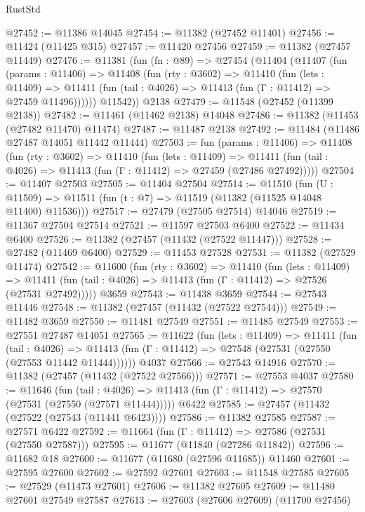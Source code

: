 \begin{lexlean}{RustStd}
\begin{coremodule}
@27452 := @11386 @14045
@27454 := @11382 (@27452 @11401)
@27456 := @11424 (@11425 @315)
@27457 := @11420 @27456
@27459 := @11382 (@27457 @11449)
@27476 := @11381
    (fun (fn : @89) =>
    @27454
      (@11404
        (@11407
          (fun (params : @11406) =>
          @11408
            (fun (rty : @3602) =>
            @11410
              (fun (lets : @11409) =>
              @11411 (fun (tail : @4026) => @11413 (fun (Γ : @11412) => @27459 @11496))))))
        @11542))
    @2138
@27479 := @11548 (@27452 (@11399 @2138))
@27482 := @11461 (@11462 @2138) @14048
@27486 := @11382 (@11453 (@27482 @11470) @11474)
@27487 := @11487 @2138
@27492 := @11484 (@11486 @27487 @14051 @11442 @11444)
@27503 := fun (params : @11406) =>
  @11408
    (fun (rty : @3602) =>
    @11410
      (fun (lets : @11409) =>
      @11411 (fun (tail : @4026) => @11413 (fun (Γ : @11412) => @27459 (@27486 @27492)))))
@27504 := @11407 @27503
@27505 := @11404 @27504
@27514 := @11510
    (fun (U : @11509) => @11511 (fun (t : @7) => @11519 (@11382 (@11525 @14048 @11400) @11536)))
@27517 := @27479 (@27505 @27514) @14046
@27519 := @11367 @27504 @27514
@27521 := @11597 @27503 @6400
@27522 := @11434 @6400
@27526 := @11382 (@27457 (@11432 (@27522 @11447)))
@27528 := @27482 (@11469 @6400)
@27529 := @11453 @27528
@27531 := @11382 (@27529 @11474)
@27542 := @11600
    (fun (rty : @3602) =>
    @11410
      (fun (lets : @11409) =>
      @11411 (fun (tail : @4026) => @11413 (fun (Γ : @11412) => @27526 (@27531 @27492)))))
    @3659
@27543 := @11438 @3659
@27544 := @27543 @11446
@27548 := @11382 (@27457 (@11432 (@27522 @27544)))
@27549 := @11482 @3659
@27550 := @11481 @27549
@27551 := @11485 @27549
@27553 := @27551 @27487 @14051
@27565 := @11622
    (fun (lets : @11409) =>
    @11411
      (fun (tail : @4026) =>
      @11413 (fun (Γ : @11412) => @27548 (@27531 (@27550 (@27553 @11442 @11444))))))
    @4037
@27566 := @27543 @14916
@27570 := @11382 (@27457 (@11432 (@27522 @27566)))
@27571 := @27553 @4037
@27580 := @11646
    (fun (tail : @4026) => @11413 (fun (Γ : @11412) => @27570 (@27531 (@27550 (@27571 @11444)))))
    @6422
@27585 := @27457 (@11432 (@27522 (@27543 (@11441 @6423))))
@27586 := @11382 @27585
@27587 := @27571 @6422
@27592 := @11664 (fun (Γ : @11412) => @27586 (@27531 (@27550 @27587)))
@27595 := @11677 (@11840 (@27286 @11842))
@27596 := @11682 @18
@27600 := @11677 (@11680 (@27596 @11685)) @11460
@27601 := @27595 @27600
@27602 := @27592 @27601
@27603 := @11548 @27585
@27605 := @27529 (@11473 @27601)
@27606 := @11382 @27605
@27609 := @11480 @27601 @27549 @27587
@27613 := @27603 (@27606 @27609) (@11700 @27456)

\end{coremodule}
\end{lexlean}
